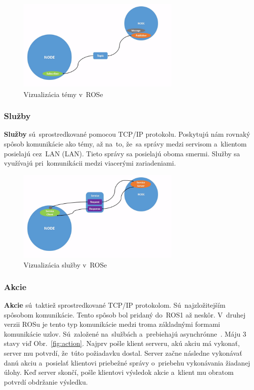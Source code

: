 	\begin{figure}[h]
		\centering
		\includegraphics[width=8cm]{img/topicsExplanation.png}
		\caption{Vizualizácia témy v~ROSe~\cite{RosDoc}}
		\label{fig:topics}
	\end{figure}

\newpage
\subsubsection{Služby}
\label{sec:services}

	\textbf {Služby} sú~sprostredkované pomocou TCP/IP protokolu. Poskytujú nám rovnaký spôsob komunikácie ako témy, až na~to, že~sa správy
	medzi servisom a~klientom posielajú cez~LAN (\acrlong{LAN}). Tieto správy sa posielajú oboma smermi. Služby sa využívajú pri~komunikácii
	medzi viacerými zariadeniami.

	\begin{figure}[h]
		\centering
		\includegraphics[width=8cm]{img/serviceExplanation.png}
		\caption{Vizualizácia služby v~ROSe~\cite{RosDoc}}
		\label{fig:service}
	\end{figure}

\subsubsection{Akcie}
\label{sec:actions}
	\textbf {Akcie} sú~taktiež sprostredkované TCP/IP protokolom. Sú~najzložitejším spôsobom komunikácie. Tento spôsob bol pridaný do~ROS1
	až neskôr. V~druhej verzii ROSu je tento typ komunikácie medzi troma základnými formami komunikácie uzlov. Sú~založené na~službách
	a~prebiehajú asynchrónne~\cite{ROS2book}. Máju 3 stavy viď Obr.~\ref{fig:action}. Najprv pošle klient serveru, akú akciu má vykonať,
	server mu potvrdí, že~túto požiadavku dostal. Server začne následne vykonávať danú akciu a~posielať klientovi priebežné správy o~priebehu
	vykonávania žiadanej úlohy. Keď server skončí, pošle klientovi výsledok akcie a~klient mu obratom potvrdí obdržanie výsledku.

